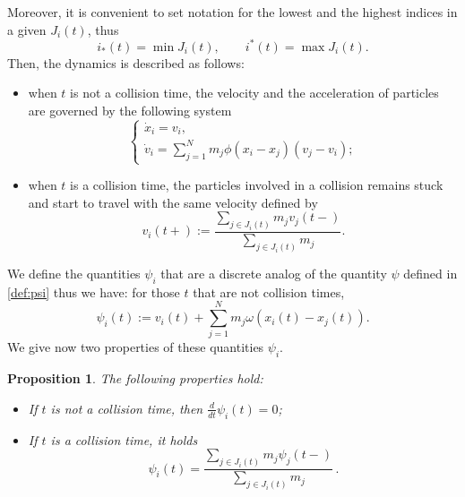 \documentclass[11pt,a4paper,oneside]{amsart}
\newtheorem{prop}[definition]{Proposition}
\begin{document}
Moreover, it is convenient to set notation for the lowest and the highest indices in a given $J_i(t)$, thus
\begin{equation}\label{def:i-star}
    i_*(t)=\min J_i(t),\qquad i^*(t)=\max J_i(t).
\end{equation}
Then, the dynamics is described as follows:

\begin{itemize}
    \item when $t$ is not a collision time, the velocity and the acceleration of particles are governed by the following system  
\begin{equation}\label{eq:C-S omega}
    \begin{cases}
        \dot x_i=v_i,\\
        \dot v_i=\sum_{j=1}^Nm_j\phi(x_i-x_j)(v_j-v_i);
    \end{cases}
\end{equation}

 \item when $t$ is a collision time, the particles involved in a collision remains stuck and start to travel with the same velocity defined by
 \begin{equation}\label{def:common-velocity}
        v_i(t+):=\frac{\sum_{j\in J_i(t)}m_j v_j(t-)}{\sum_{j\in J_i(t)}m_j}.
    \end{equation}
\end{itemize}
We define the quantities $\psi_i$ that are a discrete analog of the quantity $\psi$ defined in \eqref{def:psi} thus we have: for those $t$ that are not collision times,
\begin{equation}\label{def:psi-i}
    \psi_i(t):=v_i(t)+\sum_{j=1}^Nm_j\omega(x_i(t)-x_j(t)).
\end{equation}
We give now  two properties of these quantities $\psi_i$.
\begin{prop}\label{prop:properties-psi_i}
    The following properties hold:
\begin{itemize}
    \item[(i)] If $t$ is not a collision time, then $\frac{d}{dt}\psi_i(t)=0$;
    \item[(ii)] If $t$ is a collision time, it holds
\begin{equation}\label{eq: conservation of rho-psi}
    \psi_i(t)=\frac{\sum_{j\in J_i(t)}m_j\psi_j(t-)}{\sum_{j\in J_i(t)}m_j}\,.
\end{equation}
\end{itemize}
\end{prop}
\end{document}

